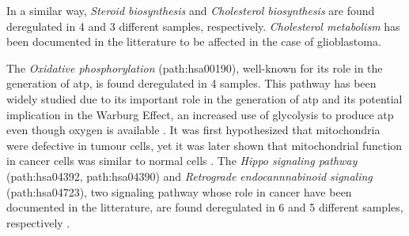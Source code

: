 In a similar way, \textit{Steroid biosynthesis} and \textit{Cholesterol biosynthesis} are found deregulated in 4 and 3 different samples, respectively.
\textit{Cholesterol metabolism} has been documented in the litterature to be affected in the case of glioblastoma.

The \textit{Oxidative phosphorylation} (path:hsa00190), well-known for its role in the generation of \acrshort{atp}, is found deregulated in 4 samples.
This pathway has been widely studied due to its important role in the generation of \acrshort{atp} and its potential implication in the Warburg Effect, an increased use of glycolysis to produce \acrshort{atp} even though oxygen is available \cite*{Spinicci2022}.
It was first hypothesized that mitochondria were defective in tumour cells, yet it was later shown that mitochondrial function in cancer cells was similar to normal cells \cite*{Cairns2011}.
The \textit{Hippo signaling pathway} (path:hsa04392, path:hsa04390) and \textit{Retrograde endocannnabinoid signaling} (path:hsa04723), two signaling pathway whose role in cancer have been documented in the litterature, are found deregulated in 6 and 5 different samples, respectively \cite*{Wei2014,Liu2018,BasuRoy2015}.

